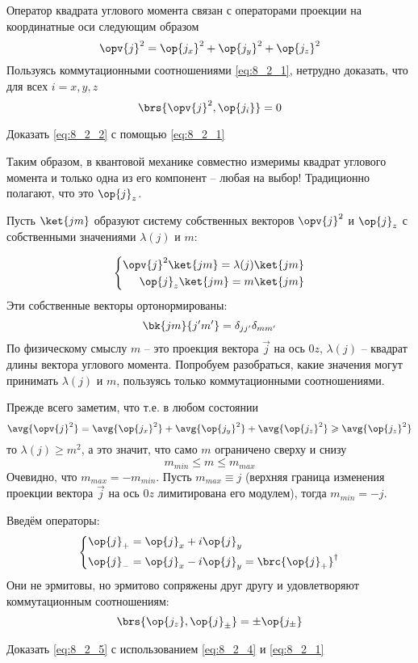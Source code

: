 Оператор квадрата углового момента связан с операторами проекции на координатные оси следующим образом
$$
\opv{j}^2 = \op{j_x}^2 + \op{j_y}^2 + \op{j_z}^2
$$%
%
Пользуясь  коммутационными соотношениями \eqref{eq:8_2_1}, нетрудно доказать, что для всех $i=x, y, z$
\begin{equation}
\label{eq:8_2_2}
\brs{\opv{j}^2, \op{j_i}} = 0
\end{equation}

\begin{excr}
Доказать \eqref{eq:8_2_2} с помощью \eqref{eq:8_2_1}
\end{excr}

Таким образом, в квантовой механике совместно измеримы квадрат углового момента и только одна из его компонент -- любая на выбор! Традиционно полагают, что это $\op{j}_z$.

Пусть $\ket{jm}$ образуют систему собственных векторов $\opv{j}^2$ и  $\op{j}_z$ с собственными значениями $\lambda(j)$ и $m$:

\begin{equation}
\label{eq:8_2_3}
\left\{
\begin{aligned}
\opv{j}^2 \ket{jm} = \lambda(j) \ket{jm} \\
\op{j}_z \ket{jm} = m \ket{jm}
\end{aligned}
\right.
\end{equation}%
%
Эти собственные векторы ортонормированы:
$$
\bk{jm}{j'm'} = \delta_{jj'} \delta_{mm'}
$$%
%
По физическому смыслу $m$ -- это проекция вектора $\vec{j}$ на ось $0z$, $\lambda(j)$ -- квадрат длины вектора углового момента. Попробуем разобраться, какие значения могут принимать $\lambda(j)$ и $m$, пользуясь только коммутационными соотношениями.

Прежде всего заметим, что т.е. в любом состоянии
$$
\avg{\opv{j}^2} = \avg{\op{j_x}^2} + \avg{\op{j_y}^2} + \avg{\op{j_z}^2} \geqslant \avg{\op{j_z}^2}
$$%
%
то $\lambda(j) \geqslant m^2$, а это значит, что само $m$ ограничено сверху и снизу
$$
m_{min} \leqslant m \leqslant m_{max}
$$%
%
Очевидно, что $m_{max} = - m_{min}$. Пусть $m_{max} \equiv j$ (верхняя граница изменения проекции вектора $\vec{j}$ на ось $0z$ лимитирована его модулем), тогда $m_{min} = -j$.

Введём операторы:
\begin{equation}
\label{eq:8_2_4}
\left\{
\begin{aligned}
\op{j}_{+} &= \op{j}_{x} + i \op{j}_{y} \\
\op{j}_{-} &= \op{j}_{x} - i \op{j}_{y} = \brc{\op{j}_{+}}^\dag
\end{aligned}
\right.
\end{equation}%
%
Они не эрмитовы, но эрмитово сопряжены друг другу и удовлетворяют коммутационным соотношениям:
\begin{equation}
\label{eq:8_2_5}
\brs{\op{j_z}, \op{j}_{\pm}} = \pm \op{j_{\pm}}
\end{equation}%
%
\begin{excr}
Доказать \eqref{eq:8_2_5} с использованием \eqref{eq:8_2_4} и \eqref{eq:8_2_1}
\end{excr}

